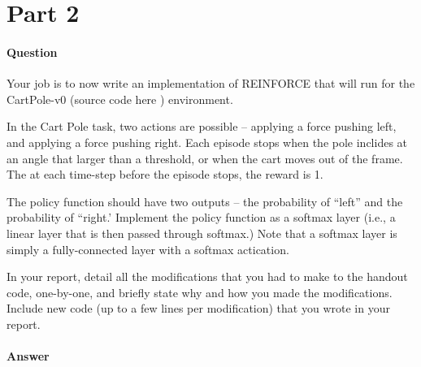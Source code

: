 \documentclass[11pt,twoside]{article}
\begin{document}
\clearpage



\section*{Part 2}

\paragraph{Question}
Your job is to now write an implementation of REINFORCE that will run for the CartPole-v0 (source code here ) environment.

In the Cart Pole task, two actions are possible – applying a force pushing left, and applying a force pushing right. Each episode stops when the pole inclides at an angle that larger than a threshold, or when the cart moves out of the frame. The at each time-step before the episode stops, the reward is 1.

The policy function should have two outputs – the probability of “left” and the probability of “right.’ Implement the policy function as a softmax layer (i.e., a linear layer that is then passed through softmax.) Note that a softmax layer is simply a fully-connected layer with a softmax actication.

In your report, detail all the modifications that you had to make to the handout code, one-by-one, and briefly state why and how you made the modifications. Include new code (up to a few lines per modification) that you wrote in your report.

\paragraph{Answer}
\end{document}
